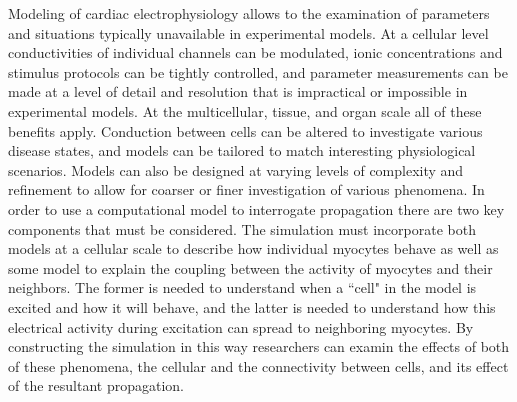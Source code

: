 \documentclass[12pt]{article}
\begin{document}
Modeling of cardiac electrophysiology allows to the examination of parameters and situations typically unavailable in experimental models.\cite{Fink2011} At a cellular level conductivities of individual channels can be modulated, ionic concentrations and stimulus protocols can be tightly controlled, and parameter measurements can be made at a level of detail and resolution that is impractical or impossible in experimental models.\cite{Sachse2008,TenTusscher2003} At the multicellular, tissue, and organ scale all of these benefits apply. Conduction between cells can be altered to investigate various disease states, and models can be tailored to match interesting physiological scenarios.\cite{Livshitz2009} Models can also be designed at varying levels of complexity and refinement to allow for coarser or finer investigation of various phenomena. In order to use a computational model to interrogate propagation there are two key components that must be considered. The simulation must incorporate both models at a cellular scale to describe how individual myocytes behave as well as some model to explain the coupling between the activity of myocytes and their neighbors. The former is needed to understand when a ``cell" in the model is excited and how it will behave, and the latter is needed to understand how this electrical activity during excitation can spread to neighboring myocytes. By constructing the simulation in this way researchers can examin the effects of both of these phenomena, the cellular and the connectivity between cells, and its effect of the resultant propagation.
\end{document}
